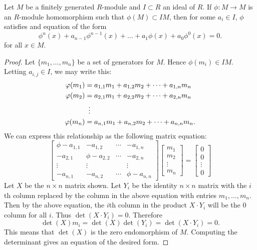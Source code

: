 \documentclass{ximera}
\begin{document}
\begin{proposition}\label{P:determinanttrick}
  Let $M$ be a finitely generated $R$-module and $I\subset R$ an ideal
  of $R$. If $\phi:M\to M$ is an $R$-module homomorphism such that
  $\phi(M)\subset I M$, then for some $a_i\in I$, $\phi$ satisfies and
  equation of the form
  \[
  \phi^n(x) + a_{n-1}\phi^{n-1}(x) + \dots + a_1 \phi(x)  + a_0 \phi^0(x)= 0.
  \]
  for all $x\in M$.
  \begin{proof}
    Let $\{m_1,\dots, m_n\}$ be a set of generators for $M$. Hence $\phi(m_i) \in I M$. Letting $a_{i,j}\in I$, we may write this:
    \begin{align*}
      \phi(m_1) &= a_{1,1}m_1 + a_{1,2}m_2 + \dots + a_{1,n}m_n\\
      \phi(m_2) &= a_{2,1}m_1 + a_{2,2}m_2 + \dots + a_{2,n}m_n\\
      &\hspace{.5em}  \vdots \\
      \phi(m_n) &= a_{n,1}m_1 + a_{n,2}m_2 + \dots + a_{n,n}m_n. 
    \end{align*}
    We can express this relationship as the following matrix equation:
    \[
    \begin{bmatrix}
      \phi - a_{1,1} & - a_{1,2} & \cdots & - a_{1,n}\\
      - a_{2,1} & \phi - a_{2,2} & \cdots & - a_{2,n}\\
      \vdots & \vdots & & \vdots \\
      -a_{n,1} & -a_{n,2} & \cdots & \phi - a_{n,n}
    \end{bmatrix}
    \begin{bmatrix}
      m_1\\
      m_2\\
      \vdots \\
      m_n
    \end{bmatrix}
    =
    \begin{bmatrix}
      0\\
      0\\
      \vdots\\
      0
    \end{bmatrix}
    \]
    Let $X$ be the $n \times n$ matrix shown.  Let $Y_i$ be the
    identity $n \times n$ matrix with the $i$th column replaced by the
    column in the above equation with entries $m_1,\dots,m_n$.  Then
    by the above equation, the $i$th column in the product $X\cdot
    Y_i$ will be the $0$ column for all $i$.  Thus $\det(X\cdot Y_i)
    =0$.  Therefore
    \[
    \det(X) m_i = \det(X) \det(Y_i) = \det(X \cdot Y_i) = 0.
    \]
    This means that $\det(X)$ is the zero endomorphism of
    $M$. Computing the determinant gives an equation of the desired
    form.
  \end{proof}
\end{proposition}
\end{document}
